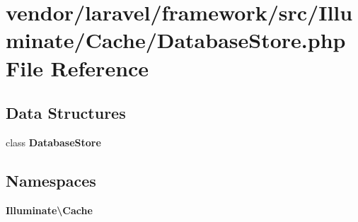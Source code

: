\section{vendor/laravel/framework/src/\+Illuminate/\+Cache/\+Database\+Store.php File Reference}
\label{_database_store_8php}
\subsection*{Data Structures}
\begin{DoxyCompactItemize}
\item 
class {\bf Database\+Store}
\end{DoxyCompactItemize}
\subsection*{Namespaces}
\begin{DoxyCompactItemize}
\item 
 {\bf Illuminate\textbackslash{}\+Cache}
\end{DoxyCompactItemize}
